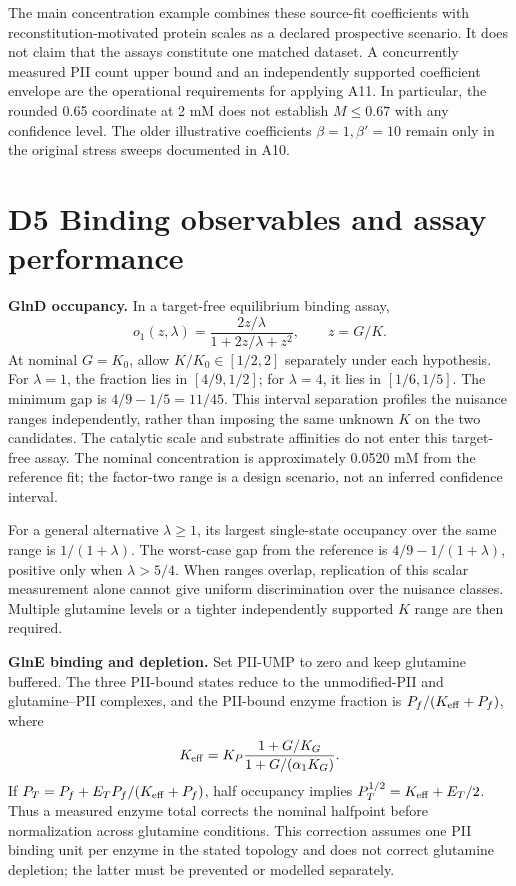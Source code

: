 \documentclass[11pt]{article}
\begin{document}
The main concentration example combines these source-fit coefficients with reconstitution-motivated protein scales as a declared prospective scenario. It does not claim that the assays constitute one matched dataset. A concurrently measured PII count upper bound and an independently supported coefficient envelope are the operational requirements for applying A11. In particular, the rounded 0.65 coordinate at 2 mM does not establish $M\leq0.67$ with any confidence level. The older illustrative coefficients $\beta=1,\beta'=10$ remain only in the original stress sweeps documented in A10.

\section*{D5 Binding observables and assay performance}

\textbf{GlnD occupancy.} In a target-free equilibrium binding assay,
\[
 o_1(z,\lambda)=\frac{2z/\lambda}{1+2z/\lambda+z^2},\qquad z=G/K.
\]
At nominal $G=K_0$, allow $K/K_0\in[1/2,2]$ separately under each hypothesis. For $\lambda=1$, the fraction lies in $[4/9,1/2]$; for $\lambda=4$, it lies in $[1/6,1/5]$. The minimum gap is $4/9-1/5=11/45$. This interval separation profiles the nuisance ranges independently, rather than imposing the same unknown $K$ on the two candidates. The catalytic scale and substrate affinities do not enter this target-free assay. The nominal concentration is approximately 0.0520 mM from the reference fit; the factor-two range is a design scenario, not an inferred confidence interval.

For a general alternative $\lambda\geq1$, its largest single-state occupancy over the same range is $1/(1+\lambda)$. The worst-case gap from the reference is $4/9-1/(1+\lambda)$, positive only when $\lambda>5/4$. When ranges overlap, replication of this scalar measurement alone cannot give uniform discrimination over the nuisance classes. Multiple glutamine levels or a tighter independently supported $K$ range are then required.

\textbf{GlnE binding and depletion.} Set PII-UMP to zero and keep glutamine buffered. The three PII-bound states reduce to the unmodified-PII and glutamine--PII complexes, and the PII-bound enzyme fraction is $P_f/(K_{\rm eff}+P_f)$, where
\[
 K_{\rm eff}=K_P\frac{1+G/K_G}{1+G/(\alpha_1K_G)}.
\]
If $P_T=P_f+E_T P_f/(K_{\rm eff}+P_f)$, half occupancy implies $P_T^{1/2}=K_{\rm eff}+E_T/2$. Thus a measured enzyme total corrects the nominal halfpoint before normalization across glutamine conditions. This correction assumes one PII binding unit per enzyme in the stated topology and does not correct glutamine depletion; the latter must be prevented or modelled separately.
\end{document}
